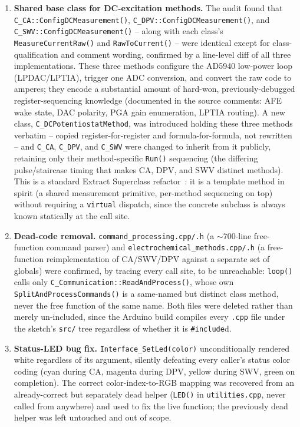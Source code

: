 \begin{enumerate}
\item \textbf{Shared base class for DC-excitation methods.} The audit found
that \texttt{C\_CA::ConfigDCMeasurement()}, \texttt{C\_DPV::ConfigDCMeasurement()},
and \texttt{C\_SWV::ConfigDCMeasurement()} -- along with each class's
\texttt{MeasureCurrentRaw()} and \texttt{RawToCurrent()} -- were identical
except for class-qualification and comment wording, confirmed by a line-level
diff of all three implementations. These three methods configure the AD5940
low-power loop (LPDAC/LPTIA), trigger one ADC conversion, and convert the raw
code to amperes; they encode a substantial amount of hard-won,
previously-debugged register-sequencing knowledge (documented in the source
comments: AFE wake state, DAC polarity, PGA gain enumeration, LPTIA routing).
A new class, \texttt{C\_DCPotentiostatMethod}, was introduced holding these
three methods verbatim -- copied register-for-register and
formula-for-formula, not rewritten -- and \texttt{C\_CA}, \texttt{C\_DPV},
and \texttt{C\_SWV} were changed to inherit from it publicly, retaining only
their method-specific \texttt{Run()} sequencing (the differing pulse/staircase
timing that makes CA, DPV, and SWV distinct methods). This is a standard
Extract Superclass refactor~\cite{fowler2018refactoring}: it is a template
method in spirit (a shared measurement primitive, per-method sequencing on
top) without requiring a \texttt{virtual} dispatch, since the concrete
subclass is always known statically at the call site.
\item \textbf{Dead-code removal.} \texttt{command\_processing.cpp/.h} (a
$\sim$700-line free-function command parser) and
\texttt{electrochemical\_methods.cpp/.h} (a free-function
reimplementation of CA/SWV/DPV against a separate set of globals) were
confirmed, by tracing every call site, to be unreachable: \texttt{loop()}
calls only \texttt{C\_Communication::ReadAndProcess()}, whose own
\texttt{SplitAndProcessCommands()} is a same-named but distinct class
method, never the free function of the same name. Both files were deleted
rather than merely un-included, since the Arduino build compiles every
\texttt{.cpp} file under the sketch's \texttt{src/} tree regardless of
whether it is \texttt{\#include}d.
\item \textbf{Status-LED bug fix.} \texttt{Interface\_SetLed(color)}
unconditionally rendered white regardless of its argument, silently
defeating every caller's status color coding (cyan during CA, magenta
during DPV, yellow during SWV, green on completion). The correct
color-index-to-RGB mapping was recovered from an already-correct but
separately dead helper (\texttt{LED()} in \texttt{utilities.cpp}, never
called from anywhere) and used to fix the live function; the previously
dead helper was left untouched and out of scope.
\end{enumerate}

